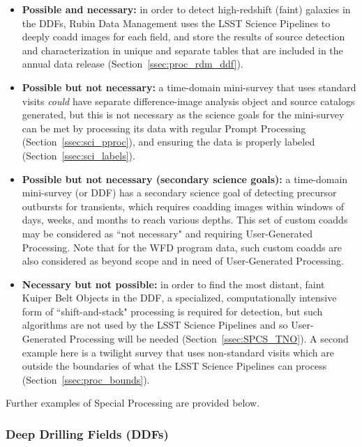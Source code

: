 \begin{itemize}

\item \textbf{Possible and necessary:}
in order to detect high-redshift (faint) galaxies in the DDFs,
Rubin Data Management uses the LSST Science Pipelines to deeply
coadd images for each field, and store the results of source
detection and characterization in unique and separate tables that
are included in the annual data release (Section~\ref{ssec:proc_rdm_ddf}).

\item \textbf{Possible but not necessary:}
a time-domain mini-survey that uses standard visits \emph{could}
have separate difference-image analysis object and source catalogs
generated, but this is not necessary as the science goals for the
mini-survey can be met by processing its data with regular Prompt
Processing (Section~\ref{ssec:sci_pproc}), and ensuring the
data is properly labeled (Section~\ref{ssec:sci_labels}).

\item \textbf{Possible but not necessary (secondary science goals):}
a time-domain mini-survey (or DDF) has a secondary science goal of detecting
precursor outbursts for transients, which requires coadding images
within windows of days, weeks, and months to reach various depths.
This set of custom coadds may be considered as ``not necessary" and requiring 
User-Generated Processing.
Note that for the WFD program data, such custom coadds are also considered 
as beyond scope and in need of User-Generated Processing.

\item \textbf{Necessary but not possible:}
in order to find the most distant, faint Kuiper Belt Objects in the DDF,
a specialized, computationally intensive form of ``shift-and-stack" processing
is required for detection, but such algorithms are not used by the 
LSST Science Pipelines and so User-Generated Processing will be needed (Section~\ref{ssec:SPCS_TNO}).
A second example here is a twilight survey that uses non-standard visits 
which are outside the boundaries of what the LSST
Science Pipelines can process (Section~\ref{ssec:proc_bounds}).

\end{itemize}

Further examples of Special Processing are provided below.

\subsubsection{Deep Drilling Fields (DDFs)}

